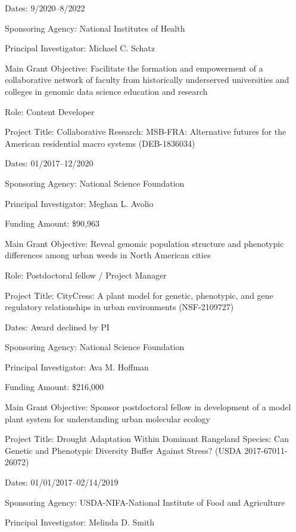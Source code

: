 \documentclass{cv}
\begin{document}
Dates: 9/2020--8/2022

Sponsoring Agency: National Institutes of Health

Principal Investigator: Michael C. Schatz

Main Grant Objective: Facilitate the formation and empowerment of a collaborative network of faculty from historically underserved universities and colleges in genomic data science education and research

Role: Content Developer

\vspace{5mm}

Project Title: Collaborative Research: MSB-FRA: Alternative futures for the American residential macro systems (DEB-1836034)

Dates: 01/2017--12/2020

Sponsoring Agency: National Science Foundation

Principal Investigator: Meghan L. Avolio

Funding Amount: \$90,963

Main Grant Objective: Reveal genomic population structure and phenotypic differences among urban weeds in North American cities

Role: Postdoctoral fellow / Project Manager

\vspace{5mm}

Project Title: CityCress: A plant model for genetic, phenotypic, and gene regulatory relationships in urban environments (NSF-2109727)

Dates: Award declined by PI

Sponsoring Agency: National Science Foundation

Principal Investigator: Ava M. Hoffman

Funding Amount: \$216,000

Main Grant Objective: Sponsor postdoctoral fellow in development of a model plant system for understanding urban molecular ecology

\vspace{5mm}

Project Title: Drought Adaptation Within Dominant Rangeland Species: Can Genetic and Phenotypic Diversity Buffer Against Stress? (USDA 2017-67011-26072)

Dates: 01/01/2017--02/14/2019

Sponsoring Agency: USDA-NIFA-National Institute of Food and Agriculture

Principal Investigator: Melinda D. Smith
\end{document}
